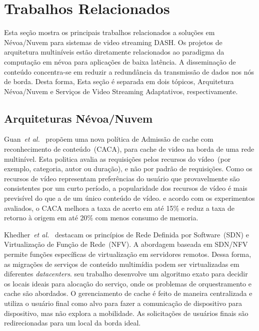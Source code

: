 \section{Trabalhos Relacionados}
\label{ch:related-work}

Esta seção mostra os principais trabalhos relacionados a soluções em Névoa/Nuvem para sistemas de video streaming DASH. 
Os projetos de arquitetura multiníveis estão diretamente relacionados ao paradigma da computação em névoa para aplicações de baixa latência. A disseminação de conteúdo concentra-se em reduzir a redundância da transmissão de dados nos nós de borda. Desta forma, Esta seção é separada em dois tópicos, Arquitetura Névoa/Nuvem e Serviços de Video Streaming Adaptativos, respectivamente. 

\subsection{Arquiteturas Névoa/Nuvem}
\label{subsec:arch-cloud-fog}


Guan~\textit{et al.}~\cite{guan:2019:CLC} propõem uma nova política de Admissão de cache com reconhecimento de conteúdo~(CACA), para cache de video na borda de uma rede multinível. Esta politica avalia as requisições pelos recursos do vídeo~(por exemplo, categoria, autor ou duração), e não por padrão de requisições. Como os recursos de vídeo representam preferências do usuário que provavelmente são consistentes por um curto período, a popularidade dos recursos de vídeo é mais previsível do que a de um único conteúdo de vídeo. e acordo com os experimentos avaliados, o CACA melhora a taxa de acerto em até 15\% e reduz a taxa de retorno à origem em até 20\% com menos consumo de memoria.

Khedher~\textit{et al.}~\cite{khedherComNet2017, khedherLCN2017} destacam os princípios de Rede Definida por Software~(SDN) e Virtualização de Função de Rede~(NFV). A abordagem baseada em SDN/NFV permite funções específicas de virtualização em servidores remotos. Dessa forma, as migrações de serviços de conteúdo multimídia podem ser virtualizadas em diferentes \textit{datacenters}. seu trabalho desenvolve um algoritmo exato para decidir os locais ideais para alocação do serviço, onde os problemas de orquestramento e cache são abordados. 
O gerenciamento de cache é feito de maneira centralizada e utiliza o usuário final como alvo para fazer a comunicação de dispositivo para dispositivo, mas não explora a mobilidade. As solicitações de usuários finais são redirecionadas para um local da borda ideal.%

